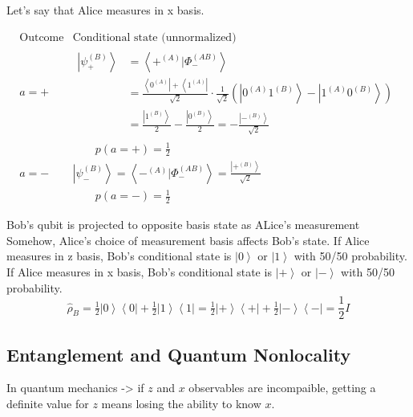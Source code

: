 \documentclass[
]{article}
\providecommand{\ket}[1]{\left\lvert #1 \right\rangle}
\providecommand{\bra}[1]{\left\langle #1 \right\rvert}
\providecommand{\braket}[1]{\left\langle #1 \right\rangle}
\begin{document}
Let's say that Alice measures in x basis.

\[
	\begin{array}{c|l}
		\text{Outcome} & \text{Conditional state (unnormalized)}                                                                                                                            \\
		\hline
		a = +          & \begin{aligned}
			                 \ket{\psi_+^{(B)}} & = \braket{+^{(A)} | \Phi_-^{(AB)}}                                                                                                           \\
			                                    & = \frac{\bra{{0}^{(A)}} + \bra{1^{(A)}}}{\sqrt{2}} \cdot \frac{1}{\sqrt{2}} \left( \ket{{0}^{(A)} 1^{(B)}} - \ket{1^{(A)} {0}^{(B)}} \right) \\
			                                    & = \frac{\ket{1^{(B)}}}{2} - \frac{\ket{{0}^{(B)}}}{2} = -\frac{\ket{-^{(B)}}}{\sqrt{2}}
		                 \end{aligned} \\
		               & \qquad p(a=+) = \tfrac{1}{2}                                                                                                                                       \\[1em]
		a = -          & \ket{\psi_-^{(B)}} = \braket{-^{(A)} | \Phi_-^{(AB)}} = \frac{\ket{+^{(B)}}}{\sqrt{2}}                                                                             \\
		               & \qquad p(a=-) = \tfrac{1}{2}
	\end{array}
\]

Bob's qubit is projected to opposite basis state as ALice's measurement
Somehow, Alice's choice of measurement basis affects Bob's state.
If Alice measures in z basis, Bob's conditional state is $\ket{0}$ or $\ket{1}$ with 50/50 probability. If Alice measures in x basis, Bob's conditional state is $\ket{+}$ or $\ket{-}$ with 50/50 probability.
\[
	\hat{\rho}_B = \tfrac{1}{2} \ket{0}\bra{0} + \tfrac{1}{2} \ket{1}\bra{1} = \tfrac{1}{2} \ket{+}\bra{+} + \tfrac{1}{2} \ket{-}\bra{-} = \frac{1}{2}I
\]
\subsection{Entanglement and Quantum Nonlocality}\label{entanglement-quantum-nonlocality}

In quantum mechanics -> if $z$ and $x$ observables are incompaible, getting a definite value for $z$ means losing the ability to know $x$.
\end{document}

